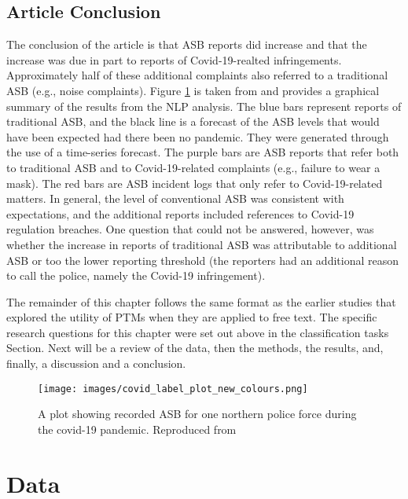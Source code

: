 \subsection{Article Conclusion}The conclusion of the article is that ASB reports did increase and that the increase was due in part to reports of Covid-19-realted infringements. Approximately half of these additional complaints also referred to a traditional ASB (e.g., noise complaints). Figure \ref{fig:ASB}  is taken from \parencite{halford_dixon_farrell_2022}  and provides a graphical summary of the results from the NLP analysis. The blue bars represent reports of traditional ASB, and the black line is a forecast of the ASB levels that would have been expected had there been no pandemic. They were generated through the use of a time-series forecast. The purple bars are ASB reports that refer both to traditional ASB and to Covid-19-related complaints (e.g., failure to wear a mask). The red bars are ASB incident logs that only refer to Covid-19-related matters. In general, the level of conventional ASB was consistent with expectations, and the additional reports included references to Covid-19 regulation breaches. One question that could not be answered, however, was whether the increase in reports of traditional ASB was attributable to additional ASB or too the lower reporting threshold (the reporters had an additional reason to call the police, namely the Covid-19 infringement).

The remainder of this chapter follows the same format as the earlier studies that explored the utility of PTMs when they are applied to free text. The specific research questions for this chapter were set out above in the classification tasks Section. Next will be a review of the data, then the  methods, the results, and, finally, a discussion and a conclusion.


\begin{figure}
  \texttt{[image: images/covid\_label\_plot\_new\_colours.png]}
  \caption[ASB in the Pandemic]{A plot showing recorded ASB for one northern police force during the covid-19 pandemic.  Reproduced from  \textcite{halford_dixon_farrell_2022} }
  \label{fig:ASB}
\end{figure}


\section{Data}

